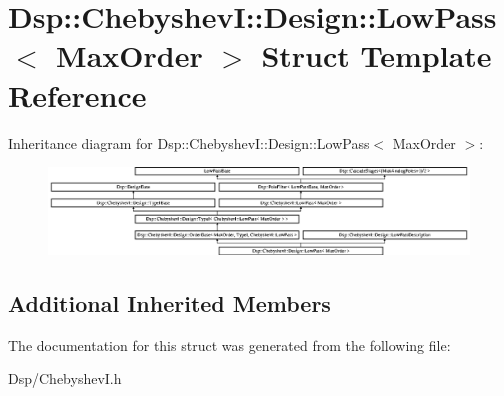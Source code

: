 \hypertarget{structDsp_1_1ChebyshevI_1_1Design_1_1LowPass}{\section{Dsp\-:\-:Chebyshev\-I\-:\-:Design\-:\-:Low\-Pass$<$ Max\-Order $>$ Struct Template Reference}
\label{structDsp_1_1ChebyshevI_1_1Design_1_1LowPass}
}
Inheritance diagram for Dsp\-:\-:Chebyshev\-I\-:\-:Design\-:\-:Low\-Pass$<$ Max\-Order $>$\-:\begin{figure}[H]
\begin{center}
\leavevmode
\includegraphics[height=2.323652cm]{structDsp_1_1ChebyshevI_1_1Design_1_1LowPass}
\end{center}
\end{figure}
\subsection*{Additional Inherited Members}


The documentation for this struct was generated from the following file\-:\begin{DoxyCompactItemize}
\item 
Dsp/Chebyshev\-I.\-h\end{DoxyCompactItemize}
